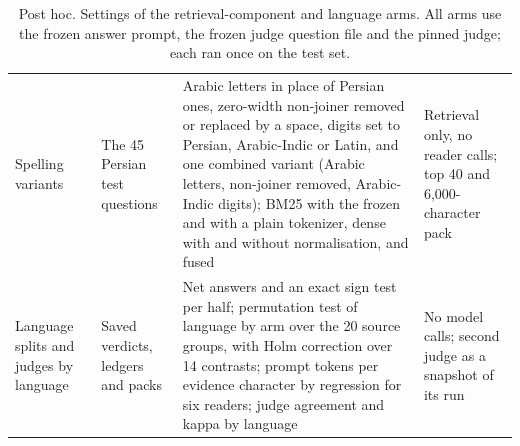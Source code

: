\begin{table}[t]
\begin{tabularx}{\textwidth}{@{}p{2.6cm}p{2.9cm}Xp{2.8cm}@{}}
Spelling variants & The 45 Persian test questions & Arabic letters in place of Persian ones, zero-width non-joiner removed or replaced by a space, digits set to Persian, Arabic-Indic or Latin, and one combined variant (Arabic letters, non-joiner removed, Arabic-Indic digits); BM25 with the frozen and with a plain tokenizer, dense with and without normalisation, and fused & Retrieval only, no reader calls; top 40 and 6,000-character pack \\
Language splits and judges by language & Saved verdicts, ledgers and packs & Net answers and an exact sign test per half; permutation test of language by arm over the 20 source groups, with Holm correction over 14 contrasts; prompt tokens per evidence character by regression for six readers; judge agreement and kappa by language & No model calls; second judge as a snapshot of its run \\
\bottomrule
\end{tabularx}
\caption{Post hoc. Settings of the retrieval-component and language arms. All arms use the frozen answer prompt, the frozen judge question file and the pinned judge; each ran once on the test set.}
\label{tab:posthoc-settings3}
\end{table}
